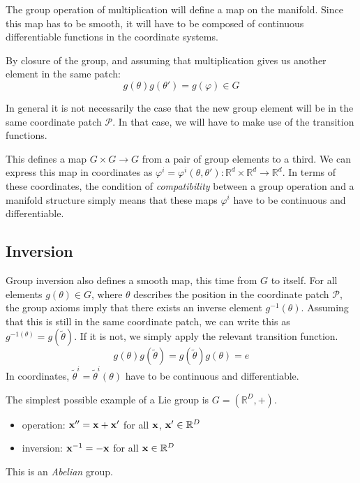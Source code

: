 The group operation of multiplication will define a map on the manifold. Since this map has to be smooth, it will have to be composed of continuous differentiable functions in the coordinate systems.

By closure of the group, and assuming that multiplication gives us another element in the same patch:
\begin{equation}
  g(\theta) g(\theta') = g(\varphi) \in G
\end{equation}
\begin{leftbar}
  \begin{remark}
    In general it is not necessarily the case that the new group element will be in the same coordinate patch $\mathcal{P}$. In that case, we will have to make use of the transition functions.
  \end{remark}
\end{leftbar}
This defines a map $G \times G \to G$ from a pair of group elements to a third.
We can express this map in coordinates as $\varphi^i = \varphi^i(\theta, \theta'): \mathbb{R}^d \times \mathbb{R}^d \to \mathbb{R}^d$.
In terms of these coordinates, the condition of \emph{compatibility} between a group operation and a manifold structure simply means that these maps $\varphi^i$ have to be continuous and differentiable.

\subsection{Inversion}%
\label{sub:inversion}

Group inversion also defines a smooth map, this time from $G$ to itself.
For all elements $g(\theta) \in G$, where $\theta$ describes the position in the coordinate patch $\mathcal{P}$, the group axioms imply that there exists an inverse element $g^{-1}(\theta)$. Assuming that this is still in the same coordinate patch, we can write this as $g^{-1(\theta)} = g(\widetilde \theta)$. If it is not, we simply apply the relevant transition function.
\begin{equation}
  g(\theta) g(\widetilde \theta) = g(\widetilde \theta) g(\theta) = e
\end{equation}
In coordinates, $\widetilde \theta^i = \widetilde \theta^i(\theta)$ have to be continuous and differentiable.

\begin{example}[]
  The simplest possible example of a Lie group is $G = (\mathbb{R}^D, +)$.
  \begin{itemize}
    \item operation: $\vb{x}'' = \vb{x} + \vb{x}'$ for all $\vb{x}$, $\vb{x}' \in \mathbb{R}^D$
    \item inversion: $\vb{x}^{-1} = -\vb{x}$ for all $\vb{x} \in \mathbb{R}^D$
  \end{itemize}
  This is an \emph{Abelian} group.
\end{example}
